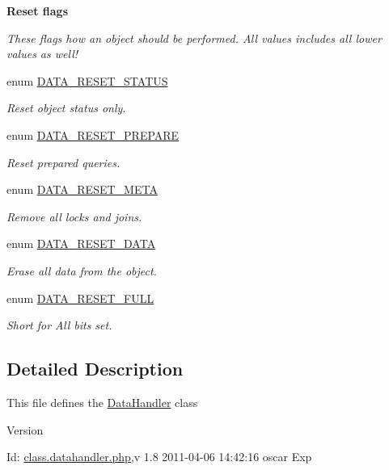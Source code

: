\begin{Indent}{\bf Reset flags}\par
{\em \label{_amgrp143448a659afeaa8616ca6e3acdb751b}
 These flags how an object should be performed. All values includes all lower values as well! }\begin{DoxyCompactItemize}
\item 
enum \hyperlink{class_8datahandler_8php_a9266811d651cb3ff8c5fdf00111e677b}{DATA\_\-RESET\_\-STATUS} 
\begin{DoxyCompactList}\small\item\em Reset object status only. \item\end{DoxyCompactList}\item 
enum \hyperlink{class_8datahandler_8php_a19a99423705b41e563424ae76d7fe184}{DATA\_\-RESET\_\-PREPARE} 
\begin{DoxyCompactList}\small\item\em Reset prepared queries. \item\end{DoxyCompactList}\item 
enum \hyperlink{class_8datahandler_8php_a3ce9f928f9ba75096925bd4157246bbb}{DATA\_\-RESET\_\-META} 
\begin{DoxyCompactList}\small\item\em Remove all locks and joins. \item\end{DoxyCompactList}\item 
enum \hyperlink{class_8datahandler_8php_a7c6305f5e748976aa75d367420a408ea}{DATA\_\-RESET\_\-DATA} 
\begin{DoxyCompactList}\small\item\em Erase all data from the object. \item\end{DoxyCompactList}\item 
enum \hyperlink{class_8datahandler_8php_a2a28429433990da242faa223d5a49f0a}{DATA\_\-RESET\_\-FULL} 
\begin{DoxyCompactList}\small\item\em Short for All bits set. \item\end{DoxyCompactList}\end{DoxyCompactItemize}
\end{Indent}


\subsection{Detailed Description}
This file defines the \hyperlink{classDataHandler}{DataHandler} class \begin{DoxyVersion}{Version}

\end{DoxyVersion}
\begin{DoxyParagraph}{Id:}
\hyperlink{class_8datahandler_8php}{class.datahandler.php},v 1.8 2011-\/04-\/06 14:42:16 oscar Exp 
\end{DoxyParagraph}


